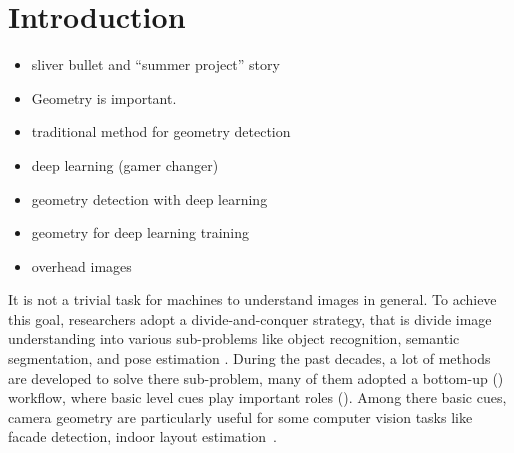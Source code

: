 \chapter{Introduction}
\label{chap:intro}

\makeatletter
\newenvironment{chapquote}[2][2em]
{\setlength{\@tempdima}{#1} \def\chapquote@author{#2} \parshape 1
  \@tempdima \dimexpr\textwidth-2\@tempdima\relax \itshape}
{\par\normalfont\hfill--\
\chapquote@author\hspace*{\@tempdima}\par\bigskip}
\makeatother


\begin{itemize}
  \item sliver bullet and ``summer project'' story
  \item Geometry is important.
  \item traditional method for geometry detection
  \item deep learning (gamer changer)
  \item geometry detection with deep learning
  \item geometry for deep learning training
  \item overhead images
\end{itemize}


It is not a trivial task for machines to understand images in general.
To achieve this goal, researchers adopt a divide-and-conquer strategy,
that is divide image understanding into various sub-problems like
object recognition, semantic segmentation, and pose estimation \etc.
During the past decades, a lot of methods are developed to solve there
sub-problem, many of them adopted a bottom-up (\todo{citations})
workflow, where basic level cues play important roles
(). Among there basic cues, camera geometry are
particularly useful for some computer vision tasks like facade
detection, indoor layout estimation~\cite{ren2016coarse}.

